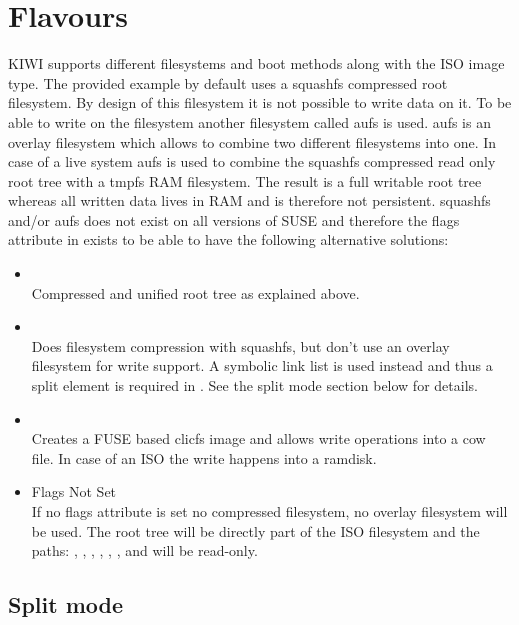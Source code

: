 \section{Flavours}

KIWI supports different filesystems and boot methods along with the
ISO image type. The provided example by default uses a squashfs compressed
root filesystem. By design of this filesystem it is not possible to write
data on it. To be able to write on the filesystem another filesystem called
aufs is used. aufs is an overlay filesystem which allows to combine two
different filesystems into one. In case of a live system aufs is used
to combine the squashfs compressed read only root tree with a tmpfs
RAM filesystem. The result is a full writable root tree whereas all
written data lives in RAM and is therefore not persistent. squashfs and/or
aufs does not exist on all versions of SUSE and therefore the flags
attribute in  exists to be able to have the following
alternative solutions:

\begin{itemize}
\item {}\\
      Compressed and unified root tree as explained above.
\item {}\\
      Does filesystem compression with squashfs, but don't use an
      overlay filesystem for write support. A symbolic link list is used
      instead and thus a split element is required in .
      See the split mode section below for details.
\item {}\\
      Creates a FUSE based clicfs image and allows write operations
      into a cow file. In case of an ISO the write happens into a
      ramdisk.
\item {Flags Not Set}\\
      If no flags attribute is set no compressed filesystem, no overlay
      filesystem will be used. The root tree will be directly part of
      the ISO filesystem and the paths: , , 
      , , ,
      , and  will be read-only.
\end{itemize}

\subsection{Split mode}

